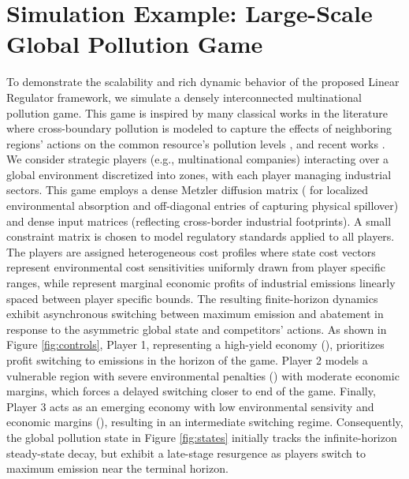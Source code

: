\documentclass[letterpaper, 10 pt, conference]{ieeeconf}
\theoremstyle{definition}
\begin{document}
\section{Simulation Example: Large-Scale Global Pollution Game}
To demonstrate the scalability and rich dynamic behavior of the proposed Linear Regulator framework, we simulate a densely interconnected multinational pollution game. This game is inspired by many classical works in the literature where cross-boundary pollution is modeled to capture the effects of neighboring regions' actions on the common resource's pollution levels \cite{van1991differential, jorgensen2001incentive}, and recent works \cite{wei2020differential, de2021equilibrium}. We consider  strategic players (e.g., multinational companies) interacting over a global environment discretized into  zones, with each player managing  industrial sectors. This game employs a dense Metzler diffusion matrix  ( for localized environmental absorption and off-diagonal entries of  capturing physical spillover) and dense input matrices  (reflecting cross-border industrial footprints). A small constraint matrix  is chosen to model regulatory standards applied to all players. The players are assigned heterogeneous cost profiles where state cost vectors  represent environmental cost sensitivities uniformly drawn from player specific ranges, while  represent marginal economic profits of industrial emissions linearly spaced between player specific bounds. The resulting finite-horizon dynamics exhibit asynchronous switching between maximum emission and abatement in response to the asymmetric global state and competitors' actions. As shown in Figure \ref{fig:controls}, Player 1, representing a high-yield economy (), prioritizes profit switching to emissions in the horizon of the game. Player 2 models a vulnerable region with severe environmental penalties () with moderate economic margins, which forces a delayed switching closer to end of the game. Finally, Player 3 acts as an emerging economy with low environmental sensivity and economic margins (), resulting in an intermediate switching regime. Consequently, the global pollution state in Figure \ref{fig:states} initially tracks the infinite-horizon steady-state decay, but exhibit a late-stage resurgence as players switch to maximum emission near the terminal horizon. 
\end{document}
